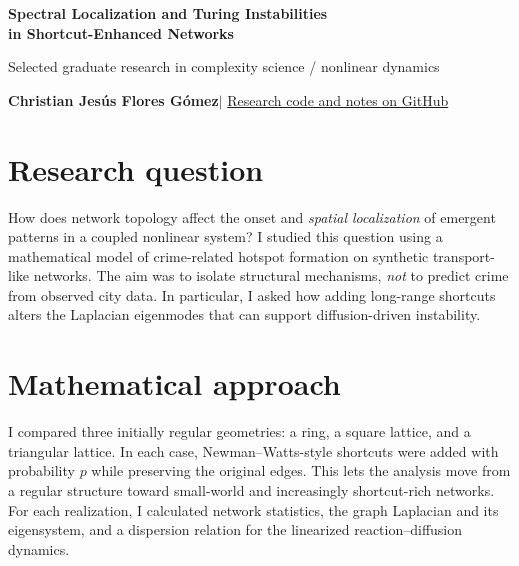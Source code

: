 \documentclass[10pt,letterpaper]{article}
\begin{document}
\begin{center}
{\LARGE\bfseries Spectral Localization and Turing Instabilities\\[-2pt] in Shortcut-Enhanced Networks}\par
\vspace{5pt}
{\color{blue}\normalsize Selected graduate research in complexity science / nonlinear dynamics}\par
\vspace{4pt}
{\bfseries Christian Jes\'us Flores G\'omez}\quad $\vert$ \quad \href{https://github.com/ChristianJFG/small_world_criminality/tree/research-application-2026}{Research code and notes on GitHub}
\end{center}
\vspace{-5pt}
\section*{Research question}
How does network topology affect the onset and \emph{spatial localization} of emergent patterns in a coupled nonlinear system? I studied this question using a mathematical model of crime-related hotspot formation on synthetic transport-like networks. The aim was to isolate structural mechanisms, \emph{not} to predict crime from observed city data. In particular, I asked how adding long-range shortcuts alters the Laplacian eigenmodes that can support diffusion-driven instability.

\section*{Mathematical approach}
I compared three initially regular geometries: a ring, a square lattice, and a triangular lattice. In each case, Newman--Watts-style shortcuts were added with probability $p$ while preserving the original edges. This lets the analysis move from a regular structure toward small-world and increasingly shortcut-rich networks. For each realization, I calculated network statistics, the graph Laplacian and its eigensystem, and a dispersion relation for the linearized reaction--diffusion dynamics.
\end{document}
